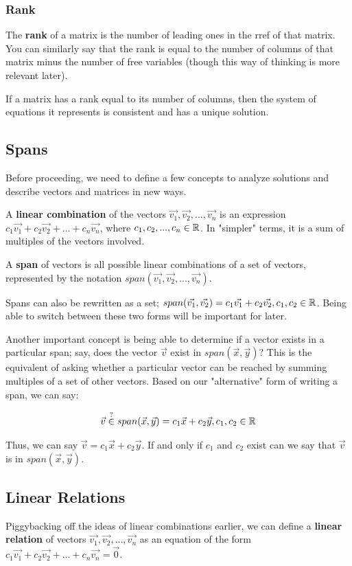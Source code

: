 \documentclass[12pt]{article}
\begin{document}
\subsubsection{Rank}

The \textbf{rank} of a matrix is the number of leading ones in the rref of that matrix. You can similarly say that the rank is equal to the number of columns of that matrix minus the number of free variables (though this way of thinking is more relevant later).

If a matrix has a rank equal to its number of columns, then the system of equations it represents is consistent and has a unique solution.

\subsection{Spans}
Before proceeding, we need to define a few concepts to analyze solutions and describe vectors and matrices in new ways.

A \textbf{linear combination} of the vectors $\Vec{v_1}, \Vec{v_2}, ..., \Vec{v_n}$ is an expression $c_1 \Vec{v_1} + c_2 \Vec{v_2} + ... + c_n \Vec{v_n}$, where $c_1, c_2,...,c_n \in \mathbb{R}$. In "simpler" terms, it is a sum of multiples of the vectors involved. 

A \textbf{span} of vectors is all possible linear combinations of a set of vectors, represented by the notation $span(\Vec{v_1}, \Vec{v_2}, ..., \Vec{v_n})$.

Spans can also be rewritten as a set; $span(\Vec{v_1}, \Vec{v_2}) = {c_1 \Vec{v_1} + c_2 \Vec{v_2}, c_1, c_2 \in \mathbb{R}}$. Being able to switch between these two forms will be important for later. 

Another important concept is being able to determine if a vector exists in a particular span; say, does the vector $\Vec{v}$ exist in $span(\Vec{x}, \Vec{y})$? This is the equivalent of asking whether a particular vector can be reached by summing multiples of a set of other vectors. Based on our "alternative" form of writing a span, we can say:

$$
\Vec{v} \stackrel{?}{\in} span(\Vec{x}, \Vec{y})={c_1\Vec{x} + c_2\Vec{y}, c_1,c_2 \in \mathbb{R}}
$$

Thus, we can say $\Vec{v} = c_1 \Vec{x} + c_2 \Vec{y}$. If and only if $c_1$ and $c_2$ exist can we say that $\Vec{v}$ is in $span(\Vec{x}, \Vec{y})$.


\subsection{Linear Relations}
Piggybacking off the ideas of linear combinations earlier, we can define a \textbf{linear relation} of vectors $\Vec{v_1}, \Vec{v_2}, ..., \Vec{v_n}$ as an equation of the form $c_1 \Vec{v_1} + c_2 \Vec{v_2} + ... + c_n \Vec{v_n} = \Vec{0}$.
\end{document}
